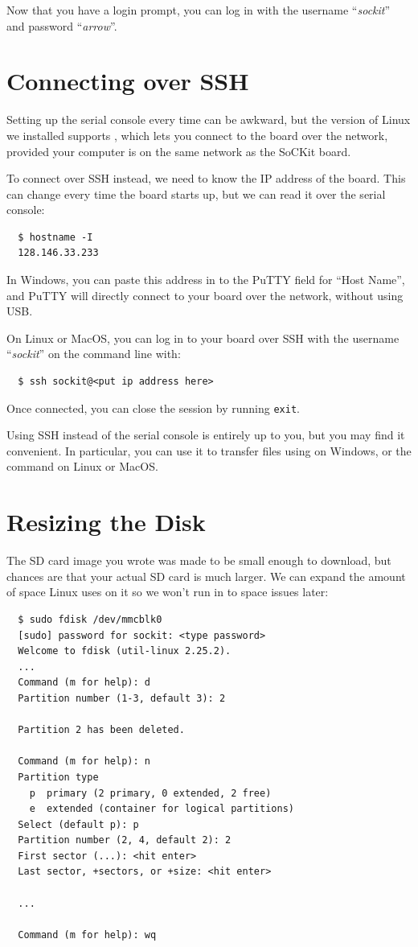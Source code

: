 \documentclass{sockitguide}
\begin{document}
Now that you have a login prompt, you can log in with the username
``\textit{sockit}'' and password ``\textit{arrow}''.

\section{Connecting over SSH}

Setting up the serial console every time can be awkward, but the
version of Linux we installed supports
, which lets
you connect to the board over the network, provided your computer is
on the same network as the SoCKit board.

To connect over SSH instead, we need to know the IP address of the
board. This can change every time the board starts up, but we can read
it over the serial console:
\begin{verbatim}
  $ hostname -I
  128.146.33.233
\end{verbatim}

In Windows, you can paste this address in to the PuTTY field for
``Host Name'', and PuTTY will directly connect to your board over the
network, without using USB.

On Linux or MacOS, you can log in to your board over SSH with the
username ``\textit{sockit}'' on the command line with:
\begin{verbatim}
  $ ssh sockit@<put ip address here>
\end{verbatim}

Once connected, you can close the session by running \texttt{exit}.

Using SSH instead of the serial console is entirely up to you, but you
may find it convenient. In particular, you can use it to transfer
files using  on
Windows, or the 
command on Linux or MacOS.

\section{Resizing the Disk}

The SD card image you wrote was made to be small enough to download,
but chances are that your actual SD card is much larger. We can expand
the amount of space Linux uses on it so we won't run in to space
issues later:
\begin{verbatim}
  $ sudo fdisk /dev/mmcblk0
  [sudo] password for sockit: <type password>
  Welcome to fdisk (util-linux 2.25.2).
  ...
  Command (m for help): d
  Partition number (1-3, default 3): 2

  Partition 2 has been deleted.

  Command (m for help): n
  Partition type
    p  primary (2 primary, 0 extended, 2 free)
    e  extended (container for logical partitions)
  Select (default p): p
  Partition number (2, 4, default 2): 2
  First sector (...): <hit enter>
  Last sector, +sectors, or +size: <hit enter>

  ...

  Command (m for help): wq
\end{verbatim}
\end{document}
